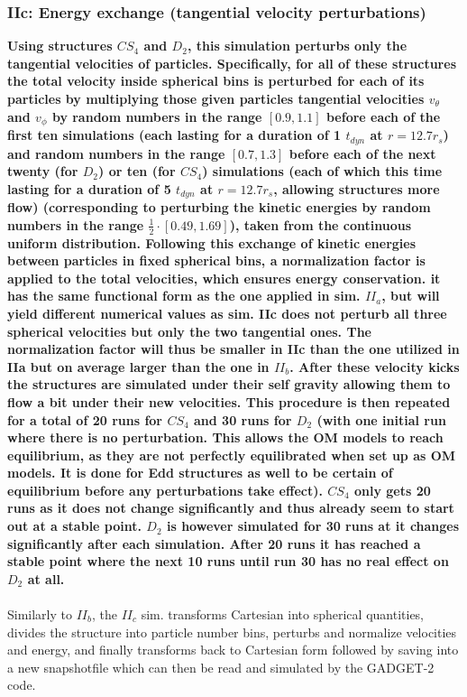 \subsubsection{IIc: Energy exchange (tangential velocity perturbations)}
\textbf{Using structures $CS_4$ and $D_2$, this simulation perturbs only the tangential velocities of particles. Specifically, for all of these structures the total velocity inside spherical bins is perturbed for each of its particles by multiplying those given particles tangential velocities $v_{\theta}$ and $v_{\phi}$ by random numbers in the range $[0.9, 1.1]$ before each of the first ten simulations (each lasting for a duration of 1 $t_{dyn}$ at $r = 12.7 r_s$) and 
random numbers in the range $[0.7, 1.3]$ before each of the next twenty (for $D_2$) or ten (for $CS_4$) simulations (each of which this time lasting for a duration of 5 $t_{dyn}$ at $r = 12.7 r_s$, allowing structures more flow) (corresponding to perturbing the kinetic energies by random numbers in the range $\frac{1}{2}\cdot[0.49, 1.69]$), taken from the continuous uniform distribution. Following this exchange of kinetic energies between particles in fixed spherical bins, a normalization factor is applied to the total velocities, which ensures energy conservation. it has the same functional form as the one applied in sim. $II_a$, but will yield different numerical values as sim. IIc does not perturb all three spherical velocities but only the two tangential ones. The normalization factor will thus be smaller in IIc than the one utilized in IIa but on average larger than the one in $II_b$. After these velocity kicks the structures are simulated under their self gravity allowing them to flow a bit under their new velocities. This procedure is then repeated for a total of 20 runs for $CS_4$ and 30 runs for $D_2$ (with one initial run where there is no perturbation. This allows the OM models to reach equilibrium, as they are not perfectly equilibrated when set up as OM models. It is done for Edd structures as well to be certain of equilibrium before any perturbations take effect). $CS_4$ only gets 20 runs as it does not change significantly and thus already seem to start out at a stable point. $D_2$ is however simulated for 30 runs at it changes significantly after each simulation. After 20 runs it has reached a stable point where the next 10 runs until run 30 has no real effect on $D_2$ at all.} \\ \\

Similarly to $II_b$, the $II_c$ sim. transforms Cartesian into spherical quantities, divides the structure into particle number bins, perturbs and normalize velocities and energy, and finally transforms back to Cartesian form followed by saving into a new snapshotfile which can then be read and simulated by the GADGET-2 code.

